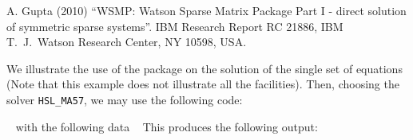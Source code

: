 \documentclass{galahad}
\begin{document}
\noindent
A. Gupta (2010)
``WSMP: Watson Sparse Matrix Package Part I - direct
solution of symmetric sparse systems''.
IBM Research Report RC 21886, IBM T.\ J.\ Watson Research Center,
NY 10598, USA.



\galexample
We illustrate the use of the package on the solution of the
single set of equations
(Note that this example does not illustrate all the facilities).
Then, choosing the solver {\tt HSL\_MA57}, we may use the following code:

{\tt \small
\VerbatimInput{\packageexample}
}
\noindent
with the following data
{\tt \small
\VerbatimInput{\packagedata}
}
\noindent
This produces the following output:
{\tt \small
\VerbatimInput{\packageresults}
}
\noindent
\end{document}
